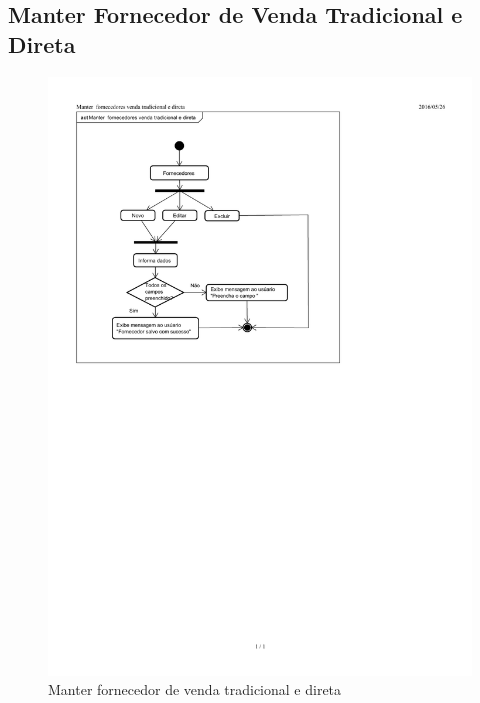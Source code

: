 \documentclass[chapter=TITLE,12pt,oneside,a4paper,english,french,sumario=tradicional,spanish,brazil,]{abntex2}
\begin{document}
\subsection{Manter Fornecedor de Venda Tradicional e Direta}
\begin{figure}[h]\centering
	\includegraphics[scale=1.6]{fornecedor.pdf}\caption{Manter fornecedor de venda tradicional e direta}
\end{figure}

\newpage
\end{document}

